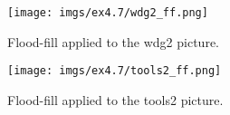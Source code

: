 \documentclass[journal]{IEEEtran}
\begin{document}
\begin{figure}[htp]
  \centering
  \texttt{[image: imgs/ex4.7/wdg2\_ff.png]}
  \caption{Flood-fill applied to the wdg2 picture.}
  \label{fig:4.7_wdg2}
\end{figure}
\FloatBarrier

\begin{figure}[htp]
  \centering
  \texttt{[image: imgs/ex4.7/tools2\_ff.png]}
  \caption{Flood-fill applied to the tools2 picture.}
  \label{fig:4.7_tools2}
\end{figure}
\FloatBarrier











%
%

\end{document}
